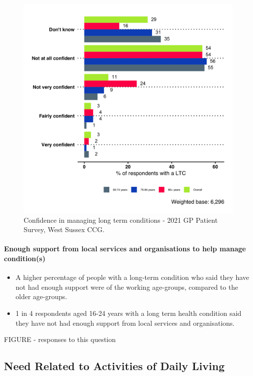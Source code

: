 \begin{figure}
    \caption{Confidence in managing long term conditions - 2021 GP Patient Survey, West Sussex CCG.}\label{fig:gpps_ltc_confidence}
    \centering
    \includegraphics[width=\linewidth]{images/GPPS_confident_LTC.png}
\end{figure}

\paragraph{Enough support from local services and organisations to help manage condition(s)} 
\begin{itemize}
    \item A higher percentage of people with a long-term condition who said they have not had enough support were of the working age-groups, compared to the older age-groups.
    \item 1 in 4 respondents aged 16-24 years with a long term health condition said they have not had enough support from local services and organisations.
\end{itemize}

FIGURE - responses to this question

\subsection{Need Related to Activities of Daily Living}
